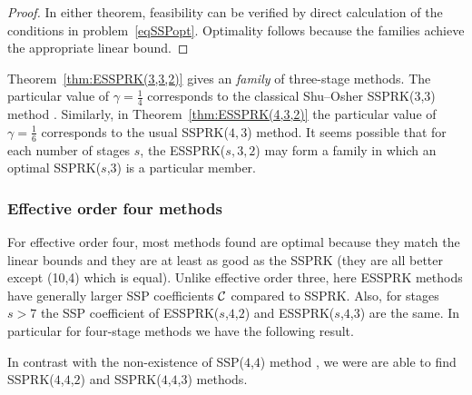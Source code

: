 \begin{proof}
  In either theorem, feasibility can be verified by direct calculation of
  the conditions in problem~\eqref{eqSSPopt}.
  Optimality follows because the families achieve the appropriate
  linear bound.
\end{proof}

Theorem~\ref{thm:ESSPRK(3,3,2)} gives an \emph{family} of three-stage methods.
The particular value of $\gamma = \frac{1}{4}$ corresponds to the
classical Shu--Osher SSPRK(3,3) method .
Similarly, in Theorem~\ref{thm:ESSPRK(4,3,2)} the particular value of $\gamma = \frac{1}{6}$ corresponds to the usual SSPRK($4,3$) method.
It seems possible that for each number of stages $s$, the ESSPRK($s, 3, 2$) may form
a family in which an optimal SSPRK($s$,$3$) is a particular member.


\subsubsection{Effective order four methods}\label{subsubsection3.4.2}


For effective order four, most methods found are optimal because they match the linear bounds and they are at least as good as the SSPRK (they are all better except (10,4) which is equal). Unlike effective order three, here ESSPRK methods have generally larger SSP coefficients $\mathcal{C}$ compared to SSPRK.
Also, for stages \( s > 7 \) the SSP coefficient of ESSPRK(\( s \),\(
4 \),\( 2 \)) and ESSPRK(\( s \),\( 4 \),\( 3 \)) are the same.
In particular for four-stage methods we have the following result.

\begin{result}
  In contrast with the non-existence of SSP(\( 4 \),\( 4 \)) method
  \cite{Gottlieb1998,Ruuth2002}, we were are able to
  find SSPRK(\( 4 \),\( 4 \),\( 2 \)) and SSPRK(\( 4 \),\( 4 \),\( 3
  \)) methods.
\end{result}



